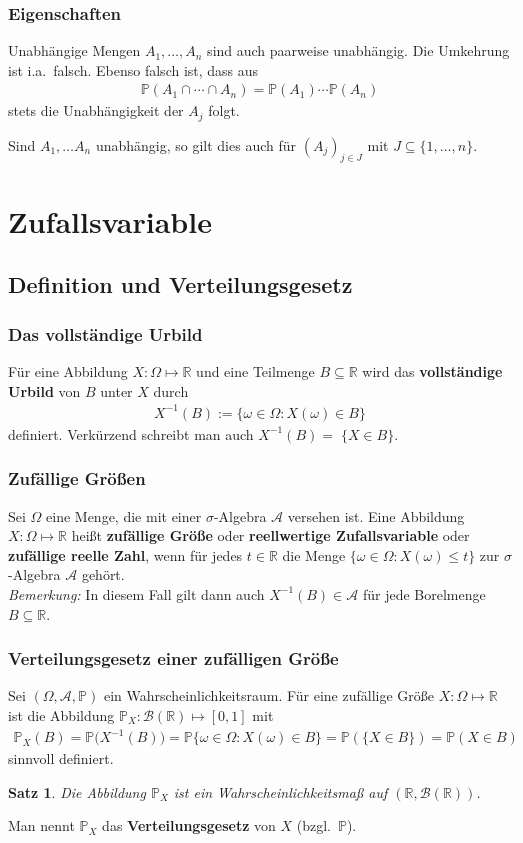 \documentclass[ngerman,draft,parskip=half,twoside]{scrartcl}
\newtheorem{thm}{Satz}[section]
\newcommand*{\R}{\mathbb{R}}      %
\newcommand*{\Algeb}{\mathcal{A}}   %
\newcommand*{\BorelM}{\mathcal{B}}  %
\newcommand*{\WKM}{\mathbb{P}}      %
\begin{document}
\subsubsection{Eigenschaften}
Unabhängige Mengen $A_1,\ldots,A_n$ sind auch paarweise unabhängig. Die Umkehrung ist
i.a.~falsch. Ebenso falsch ist, dass aus
\begin{gather*}
  \WKM(A_{1}\cap\cdots\cap A_{n})= \WKM(A_{1})\cdots\WKM(A_{n})
\end{gather*}
stets die Unabhängigkeit der $A_j$ folgt.

Sind $A_1,\ldots A_n$ unabhängig, so gilt dies auch für $(A_j)_{j\in J}$  mit
$J\subseteq \{1,\ldots,n\}$.

\section{Zufallsvariable}
\subsection{Definition und Verteilungsgesetz}

\subsubsection{Das vollständige Urbild}
Für eine Abbildung $X\colon\Omega\mapsto\R$ und eine Teilmenge $B\subseteq\R$ wird das
\textbf{vollständige Urbild} von $B$ unter $X$ durch
\begin{gather*}
  X^{-1}(B):=\{\omega\in\Omega \colon X(\omega)\in B\}
\end{gather*}
definiert. Verkürzend schreibt man auch $X^{-1}(B)=\;\{X\in B\}$.
\subsubsection{Zufällige Größen}
Sei $\Omega$ eine Menge, die mit einer $\sigma$-Algebra $\Algeb$ versehen ist. Eine Abbildung
$X\colon\Omega\mapsto\R$ heißt \textbf{zufällige Größe} oder \textbf{reellwertige Zufallsvariable}
oder \textbf{zufällige reelle Zahl}, wenn für jedes $t\in\R$ die Menge $\{\omega\in\Omega\colon X(\omega)\le t\}$
zur $\sigma$-Algebra $\Algeb$ gehört.\\
\textit{Bemerkung:} In diesem Fall gilt dann auch $X^{-1}(B)\in\Algeb$ für jede Borelmenge $B\subseteq \R$.

\subsubsection{Verteilungsgesetz einer zufälligen Größe}
Sei $(\Omega,\Algeb,\WKM)$ ein Wahrscheinlichkeitsraum.
Für eine zufällige Größe $X\colon\Omega\mapsto\R$ ist die Abbildung
$\WKM_X \colon \BorelM(\R)\mapsto [0,1]$ mit
\begin{gather*}
  \WKM_X(B)=\WKM\big(X^{-1}(B)\big)=\WKM\{\omega\in\Omega \colon X(\omega)\in B\}=\WKM(\{X\in B\})= \WKM(X\in B)
\end{gather*}
sinnvoll definiert.
\begin{thm}
Die Abbildung $\WKM_X$ ist ein Wahrscheinlichkeitsmaß auf $(\R,\BorelM(\R))$.
\end{thm}
Man nennt $\WKM_X$ das \textbf{Verteilungsgesetz} von $X$ (bzgl.~$\WKM$).
\end{document}

